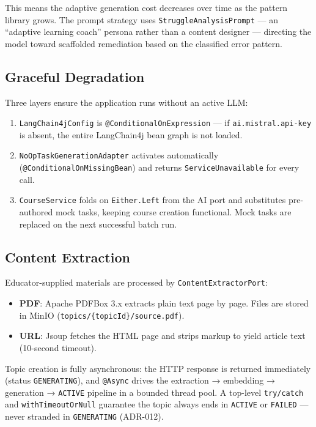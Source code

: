 This means the adaptive generation cost decreases over time as the pattern library grows. The prompt strategy uses \texttt{StruggleAnalysisPrompt} — an ``adaptive learning coach'' persona rather than a content designer — directing the model toward scaffolded remediation based on the classified error pattern.

\subsection{Graceful Degradation}
\label{ssec:ai_degradation}

Three layers ensure the application runs without an active LLM:
\begin{enumerate}
    \item \texttt{LangChain4jConfig} is \texttt{@ConditionalOnExpression} — if \texttt{ai.mistral.api-key} is absent, the entire LangChain4j bean graph is not loaded.
    \item \texttt{NoOpTaskGenerationAdapter} activates automatically (\texttt{@ConditionalOnMissingBean}) and returns \texttt{ServiceUnavailable} for every call.
    \item \texttt{CourseService} folds on \texttt{Either.Left} from the AI port and substitutes pre-authored mock tasks, keeping course creation functional. Mock tasks are replaced on the next successful batch run.
\end{enumerate}

\subsection{Content Extraction}
\label{ssec:content_extraction}

Educator-supplied materials are processed by \texttt{ContentExtractorPort}:
\begin{itemize}
    \item \textbf{PDF}: Apache PDFBox 3.x extracts plain text page by page. Files are stored in MinIO (\texttt{topics/\{topicId\}/source.pdf}).
    \item \textbf{URL}: Jsoup fetches the HTML page and strips markup to yield article text (10-second timeout).
\end{itemize}

Topic creation is fully asynchronous: the HTTP response is returned immediately (status \texttt{GENERATING}), and \texttt{@Async} drives the extraction → embedding → generation → \texttt{ACTIVE} pipeline in a bounded thread pool. A top-level \texttt{try/catch} and \texttt{withTimeoutOrNull} guarantee the topic always ends in \texttt{ACTIVE} or \texttt{FAILED} — never stranded in \texttt{GENERATING} (ADR-012).

